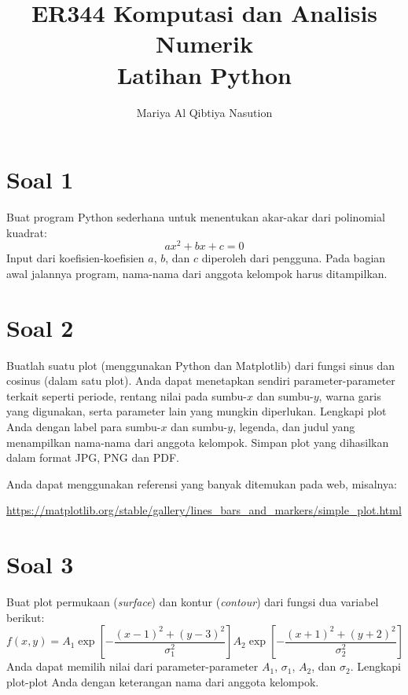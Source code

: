 



\title{%
{\small ER344 Komputasi dan Analisis Numerik}\\
Latihan Python
}
\author{Mariya Al Qibtiya Nasution}
\date{}
\maketitle

\section{Soal 1}
Buat program Python sederhana untuk menentukan akar-akar dari polinomial
kuadrat:
\begin{equation*}
ax^2 + bx + c = 0
\end{equation*}
Input dari koefisien-koefisien $a$, $b$, dan $c$ diperoleh dari pengguna.
Pada bagian awal jalannya program, nama-nama dari anggota kelompok harus
ditampilkan.


\section{Soal 2}
Buatlah suatu plot (menggunakan Python dan Matplotlib)
dari fungsi sinus dan cosinus (dalam satu plot).
Anda dapat menetapkan sendiri parameter-parameter terkait seperti
periode, rentang nilai pada sumbu-$x$ dan sumbu-$y$, warna garis yang
digunakan, serta parameter lain yang mungkin diperlukan.
Lengkapi plot Anda dengan label para sumbu-$x$ dan sumbu-$y$, legenda,
dan judul yang menampilkan nama-nama dari anggota kelompok.
Simpan plot yang dihasilkan dalam format JPG, PNG dan PDF.

Anda dapat menggunakan referensi yang banyak ditemukan pada web, misalnya:

{\footnotesize
\url{https://matplotlib.org/stable/gallery/lines_bars_and_markers/simple_plot.html}}

\section{Soal 3}
Buat plot permukaan (\textit{surface}) dan kontur (\textit{contour})
dari fungsi dua variabel berikut:
\begin{equation*}
f(x,y) = A_{1} \exp\left[ -\frac{(x-1)^2 + (y-3)^2}{\sigma_{1}^{2}} \right]
A_{2} \exp\left[ -\frac{(x+1)^2 + (y+2)^2}{\sigma_{2}^{2}} \right]
\end{equation*}
Anda dapat memilih nilai dari parameter-parameter $A_{1}$, $\sigma_{1}$,
$A_{2}$, dan $\sigma_{2}$.
Lengkapi plot-plot Anda dengan keterangan nama dari anggota kelompok.

